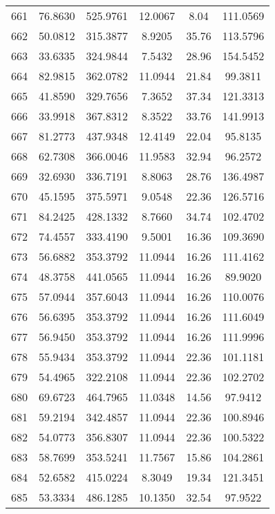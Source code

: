 \begin{center}
\begin{footnotesize}
\begin{tabular}{|c|ccccc|}
661 & 76.8630 & 525.9761 & 12.0067 & 8.04 & 111.0569 \\
662 & 50.0812 & 315.3877 & 8.9205 & 35.76 & 113.5796 \\
663 & 33.6335 & 324.9844 & 7.5432 & 28.96 & 154.5452 \\
664 & 82.9815 & 362.0782 & 11.0944 & 21.84 & 99.3811 \\
665 & 41.8590 & 329.7656 & 7.3652 & 37.34 & 121.3313 \\
666 & 33.9918 & 367.8312 & 8.3522 & 33.76 & 141.9913 \\
667 & 81.2773 & 437.9348 & 12.4149 & 22.04 & 95.8135 \\
668 & 62.7308 & 366.0046 & 11.9583 & 32.94 & 96.2572 \\
669 & 32.6930 & 336.7191 & 8.8063 & 28.76 & 136.4987 \\
670 & 45.1595 & 375.5971 & 9.0548 & 22.36 & 126.5716 \\
671 & 84.2425 & 428.1332 & 8.7660 & 34.74 & 102.4702 \\
672 & 74.4557 & 333.4190 & 9.5001 & 16.36 & 109.3690 \\
673 & 56.6882 & 353.3792 & 11.0944 & 16.26 & 111.4162 \\
674 & 48.3758 & 441.0565 & 11.0944 & 16.26 & 89.9020 \\
675 & 57.0944 & 357.6043 & 11.0944 & 16.26 & 110.0076 \\
676 & 56.6395 & 353.3792 & 11.0944 & 16.26 & 111.6049 \\
677 & 56.9450 & 353.3792 & 11.0944 & 16.26 & 111.9996 \\
678 & 55.9434 & 353.3792 & 11.0944 & 22.36 & 101.1181 \\
679 & 54.4965 & 322.2108 & 11.0944 & 22.36 & 102.2702 \\
680 & 69.6723 & 464.7965 & 11.0348 & 14.56 & 97.9412 \\
681 & 59.2194 & 342.4857 & 11.0944 & 22.36 & 100.8946 \\
682 & 54.0773 & 356.8307 & 11.0944 & 22.36 & 100.5322 \\
683 & 58.7699 & 353.5241 & 11.7567 & 15.86 & 104.2861 \\
684 & 52.6582 & 415.0224 & 8.3049 & 19.34 & 121.3451 \\
685 & 53.3334 & 486.1285 & 10.1350 & 32.54 & 97.9522 \\
\hline
\end{tabular}
\end{footnotesize}
\end{center}

